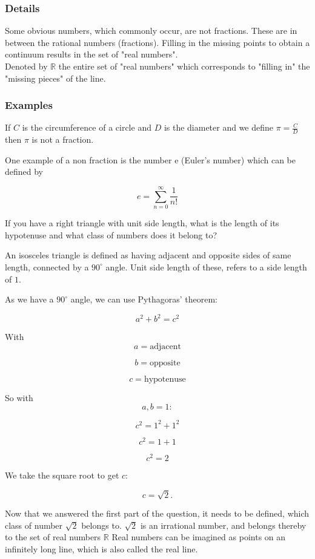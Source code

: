 \documentclass[12pt,a4paper]{article}
\theoremstyle{regla}
\theoremstyle{remark}
\theoremstyle{definition}
\theoremstyle{nonumberbreak}
\begin{document}
\subsubsection{Details}
Some obvious numbers, which commonly occur, are not fractions. These are in between the rational numbers (fractions).  Filling in the missing points to obtain a continuum results in the set of "real numbers".\\

Denoted by $\mathbb{R}$ the entire set of "real numbers"  which corresponds to "filling in"  the "missing pieces"  of the line. 

\subsubsection{Examples}

\begin{xmpl}
If $C$ is the circumference of a circle and $D$ is the diameter and we define $\pi=\frac{C}{D}$ then $\pi$ is not a fraction.
\end{xmpl}


\begin{xmpl}
One example of a non fraction is the number e (Euler's number) which can be defined by   

$$e = \sum_{n=0}^{\infty }\frac{1}{n!}$$
\end{xmpl}
\begin{xmpl}

If you have a right triangle with unit side length, what is the length of its hypotenuse and what class of numbers does it belong to?

An isosceles triangle is defined as having adjacent and opposite sides of same length, connected by a 
$90^{\circ}$ angle.
Unit side length of these, refers to a side length of $1$.
 
As we have a $90^{\circ}$ angle, we can use Pythagoras' theorem:

$$a^2+b^2=c^2$$

With
$$a=\text{adjacent}$$

$$b=\text{opposite}$$

$$c=\text{hypotenuse}$$

So with $$a,b=1:$$

$$c^2=1^2+1^2$$

$$c^2=1+1$$

$$c^2=2$$

We take the square root to get $c$:

$$c=\sqrt{2}.$$

Now that we answered the first part of the question, it needs to be defined, which class of number $\sqrt{2}$ belongs to. $\sqrt{2}$ is an irrational number, and belongs thereby to the set of real numbers $\mathbb{R}$ Real numbers can be imagined as points on an infinitely long line, which is also called the real line.
\end{xmpl}
\end{document}
